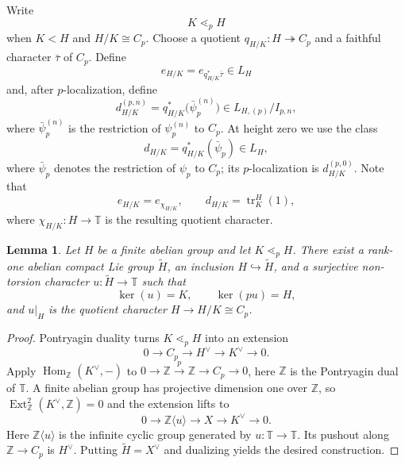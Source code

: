 \documentclass[11pt,reqno]{amsart}
\newtheorem{lemma}[lemma]{Lemma}
\newcommand{\bbT}{\mathbb T}
\newcommand{\bbZ}{\mathbb Z}
\DeclareMathOperator{\Hom}{Hom}
\DeclareMathOperator{\Ext}{Ext}
\begin{document}
Write
\[
  K\mathrel{\lessdot_p}H
\]
when $K<H$ and $H/K\cong C_p$.  Choose a quotient $q_{H/K}:H\twoheadrightarrow C_p$ and a faithful character $\bar\tau$ of $C_p$.  Define
\[
  e_{H/K}=e_{q_{H/K}^*\bar\tau}\in L_H
\]
and, after $p$-localization, define
\[
 d_{H/K}^{(p,n)}
 =q_{H/K}^*\bigl(\bar\psi_p^{(n)}\bigr)
 \in L_{H,(p)}/I_{p,n},
\]
where $\bar\psi_p^{(n)}$ is the restriction of $\psi_p^{(n)}$ to $C_p$.
At height zero we use the class
\[
  d_{H/K}=q_{H/K}^*(\bar\psi_p)\in L_H,
\]
where $\bar\psi_p$ denotes the restriction of $\psi_p$ to $C_p$; its $p$-localization is $d_{H/K}^{(p,0)}$. Note that
\[
e_{H/K}=e_{\chi_{H/K}},\qquad
d_{H/K}=\operatorname{tr}_K^H(1),
\]
where $\chi_{H/K}:H\to\mathbb T$ is the resulting quotient character.



\begin{lemma}\label{lem:adapted-group}
Let $H$ be a finite abelian group and let $K\mathrel{\lessdot_p}H$.  There
exist a rank-one abelian compact Lie group $\widetilde H$, an inclusion
$H\hookrightarrow\widetilde H$, and a surjective non-torsion character
$u:\widetilde H\to\bbT$ such that
\[
 \ker(u)=K,
 \qquad
 \ker(pu)=H,
\]
and $u|_H$ is the quotient character $H\to H/K\cong C_p$.
\end{lemma}

\begin{proof}
Pontryagin duality turns $K\lessdot_p H$ into an extension
\[
 0\longrightarrow C_p\longrightarrow H^\vee\longrightarrow K^\vee
 \longrightarrow0.
\]
Apply $\Hom_{\bbZ}(K^\vee,-)$ to $0\to\bbZ\xrightarrow{p}\bbZ\to C_p\to0$, here $\bbZ$ is the Pontryagin dual of $\bbT$. A finite abelian group has
projective dimension one over $\bbZ$, so
$\Ext^2_{\bbZ}(K^\vee,\bbZ)=0$ and the extension lifts to
\[
 0\longrightarrow\bbZ\langle u\rangle\longrightarrow X
 \longrightarrow K^\vee\longrightarrow0.
\]
Here $\bbZ\langle u\rangle$ is the infinite cyclic group generated by $u:\bbT \to \bbT$.
Its pushout along $\bbZ\to C_p$ is $H^\vee$.  Putting $\widetilde H=X^\vee$ and dualizing yields the desired construction.
\end{proof}
\end{document}
